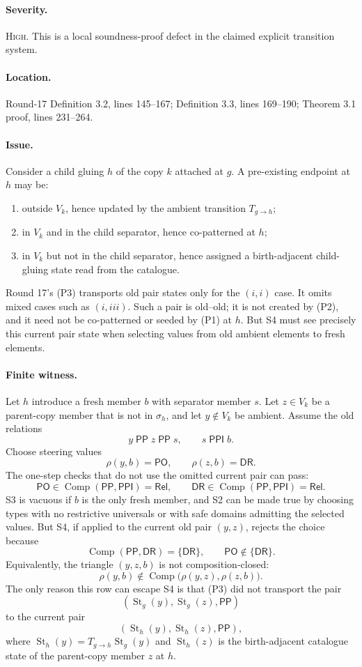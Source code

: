 \documentclass[11pt]{article}
\newcommand{\PP}{\mathsf{PP}}
\newcommand{\PPI}{\mathsf{PPI}}
\newcommand{\PO}{\mathsf{PO}}
\newcommand{\DR}{\mathsf{DR}}
\newcommand{\Rel}{\mathsf{Rel}}
\newcommand{\Comp}{\operatorname{Comp}}
\newcommand{\St}{\operatorname{St}}
\newcommand{\sev}[1]{\textsc{#1}}
\begin{document}
\paragraph{Severity.} \sev{High}.  This is a local soundness-proof defect in the claimed explicit transition system.

\paragraph{Location.} Round-17 Definition 3.2, lines 145--167; Definition 3.3, lines 169--190; Theorem 3.1 proof, lines 231--264.

\paragraph{Issue.}  Consider a child gluing $h$ of the copy $k$ attached at $g$.  A pre-existing endpoint at $h$ may be:
\begin{enumerate}[label=(\roman*)]
  \item outside $V_k$, hence updated by the ambient transition $T_{g\to h}$;
  \item in $V_k$ and in the child separator, hence co-patterned at $h$;
  \item in $V_k$ but not in the child separator, hence assigned a birth-adjacent child-gluing state read from the catalogue.
\end{enumerate}
Round 17's (P3) transports old pair states only for the $(i,i)$ case.  It omits mixed cases such as $(i,iii)$.  Such a pair is old--old; it is not created by (P2), and it need not be co-patterned or seeded by (P1) at $h$.  But S4 must see precisely this current pair state when selecting values from old ambient elements to fresh elements.

\paragraph{Finite witness.}  Let $h$ introduce a fresh member $b$ with separator member $s$.  Let $z\in V_k$ be a parent-copy member that is not in $\sigma_h$, and let $y\notin V_k$ be ambient.  Assume the old relations
\[
  y\;\PP\;z\;\PP\;s,
  \qquad s\;\PPI\;b.
\]
Choose steering values
\[
  \rho(y,b)=\PO,
  \qquad
  \rho(z,b)=\DR.
\]
The one-step checks that do not use the omitted current pair can pass:
\[
  \PO\in\Comp(\PP,\PPI)=\Rel,
  \qquad
  \DR\in\Comp(\PP,\PPI)=\Rel.
\]
S3 is vacuous if $b$ is the only fresh member, and S2 can be made true by choosing types with no restrictive universals or with safe domains admitting the selected values.  But S4, if applied to the current old pair $(y,z)$, rejects the choice because
\[
  \Comp(\PP,\DR)=\{\DR\},
  \qquad
  \PO\notin\{\DR\}.
\]
Equivalently, the triangle $(y,z,b)$ is not composition-closed:
\[
  \rho(y,b)\notin\Comp\bigl(\rho(y,z),\rho(z,b)\bigr).
\]
The only reason this row can escape S4 is that (P3) did not transport the pair
\[
  (\St_g(y),\St_g(z),\PP)
\]
to the current pair
\[
  (\St_h(y),\St_h(z),\PP),
\]
where $\St_h(y)=T_{g\to h}\St_g(y)$ and $\St_h(z)$ is the birth-adjacent catalogue state of the parent-copy member $z$ at $h$.
\end{document}
